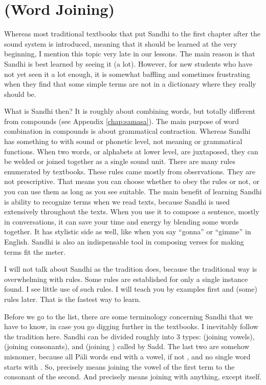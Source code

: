\chapter{ (Word Joining)}\label{chap:sandhi}

Whereas most traditional textbooks that put Sandhi to the first chapter after the sound system is introduced, meaning that it should be learned at the very beginning, I mention this topic very late in our lessons. The main reason is that Sandhi is best learned by seeing it (a lot). However, for new students who have not yet seen it a lot enough, it is somewhat baffling and sometimes frustrating when they find that some simple terms are not in a dictionary where they really should be.

What is Sandhi then? It is roughly about combining words, but totally different from compounds (see Appendix \ref{chap:samasa}). The main purpose of word combination in compounds is about grammatical contraction. Whereas Sandhi has something to with sound or phonetic level, not meaning or grammatical functions. When two words, or alphabets at lower level, are juxtaposed, they can be welded or joined together as a single sound unit. There are many rules enumerated by textbooks. These rules came mostly from observations. They are not prescriptive. That means you can choose whether to obey the rules or not, or you can use them as long as you see suitable. The main benefit of learning Sandhi is ability to recognize terms when we read texts, because Sandhi is used extensively throughout the texts. When you use it to compose a sentence, mostly in conversations, it can save your time and energy by blending some words together. It has stylistic side as well, like when you say ``gonna'' or ``gimme'' in English. Sandhi is also an indispensable tool in composing verses for making terms fit the meter.

I will not talk about Sandhi as the tradition does, because the traditional way is overwhelming with rules. Some rules are established for only a single instance found. I see little use of such rules. I will teach you by examples first and (some) rules later. That is the fastest way to learn.

Before we go to the list, there are some terminology concerning Sandhi that we have to know, in case you go digging further in the textbooks. I inevitably follow the tradition here. Sandhi can be divided roughly into 3 types:  (joining vowels),  (joining consonants), and  (joining ) called  by Sadd. The last two are somehow misnomer, because all P\=ali words end with a vowel, if not , and no single word starts with . So,  precisely means joining the vowel of the first term to the consonant of the second. And  precisely means joining  with anything, except  itself.


